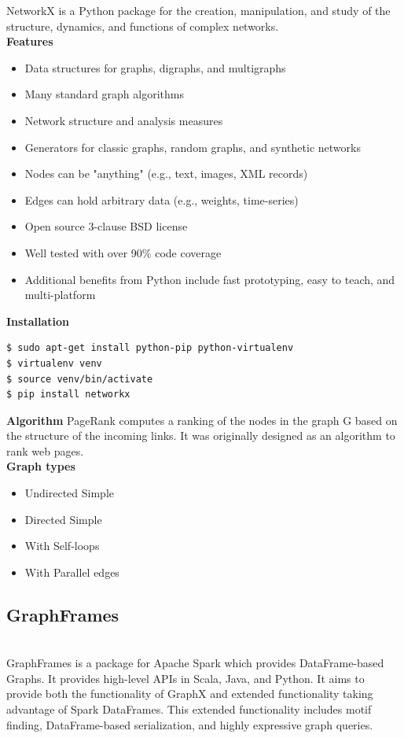 NetworkX is a Python package for the creation, manipulation, and study of the structure, dynamics, and functions of complex networks.\\

  
{\bf Features}
\begin{itemize}
    \item Data structures for graphs, digraphs, and multigraphs
    \item Many standard graph algorithms
    \item Network structure and analysis measures
    \item Generators for classic graphs, random graphs, and synthetic networks
    \item Nodes can be "anything" (e.g., text, images, XML records)
    \item Edges can hold arbitrary data (e.g., weights, time-series)
    \item Open source 3-clause BSD license
    \item Well tested with over 90\% code coverage
    \item Additional benefits from Python include fast prototyping, easy to teach, and multi-platform
\end{itemize}

{\bf Installation}
\begin{verbatim}
$ sudo apt-get install python-pip python-virtualenv
$ virtualenv venv
$ source venv/bin/activate
$ pip install networkx
\end{verbatim}

{\bf Algorithm}
PageRank computes a ranking of the nodes in the graph G based on the structure of the incoming links. It was originally designed as an algorithm to rank web pages.\\


{\bf Graph types}
\begin{itemize}
\item Undirected Simple
\item Directed Simple
\item With Self-loops
\item With Parallel edges

\end{itemize}


\subsection{GraphFrames}

\\GraphFrames is a package for Apache Spark which provides DataFrame-based Graphs. It provides high-level APIs in Scala, Java, and Python. It aims to provide both the functionality of GraphX and extended functionality taking advantage of Spark DataFrames. This extended functionality includes motif finding, DataFrame-based serialization, and highly expressive graph queries.\\


